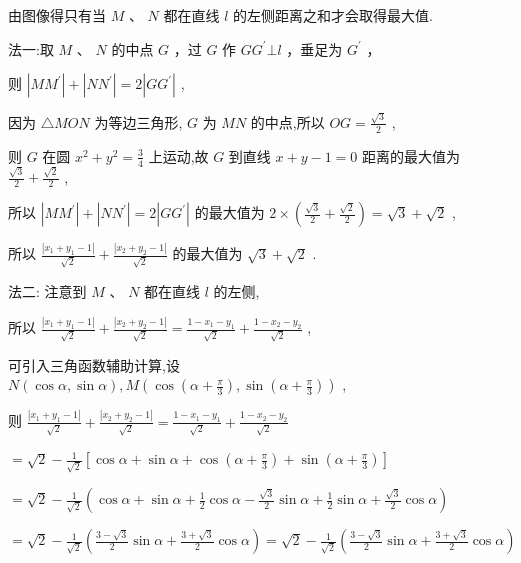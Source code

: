 \documentclass[10pt]{article}
\begin{document}
由图像得只有当 \(M\text{ 、 }N\) 都在直线 \(l\) 的左侧距离之和才会取得最大值.

法一:取 \(M\text{ 、 }N\) 的中点 \(G\) ，过 \(G\) 作 \(G{G}^{\prime } \bot  l\) ，垂足为 \({G}^{\prime }\) ，

则 \(\left| {M{M}^{\prime }}\right|  + \left| {N{N}^{\prime }}\right|  = 2\left| {G{G}^{\prime }}\right|\) ,

因为 \(\bigtriangleup {MON}\) 为等边三角形, \(G\) 为 \({MN}\) 的中点,所以 \({OG} = \frac{\sqrt{3}}{2}\) ,

则 \(G\) 在圆 \({x}^{2} + {y}^{2} = \frac{3}{4}\) 上运动,故 \(G\) 到直线 \(x + y - 1 = 0\) 距离的最大值为 \(\frac{\sqrt{3}}{2} + \frac{\sqrt{2}}{2}\) ,

所以 \(\left| {M{M}^{\prime }}\right|  + \left| {N{N}^{\prime }}\right|  = 2\left| {G{G}^{\prime }}\right|\) 的最大值为 \(2 \times  \left( {\frac{\sqrt{3}}{2} + \frac{\sqrt{2}}{2}}\right)  = \sqrt{3} + \sqrt{2}\) ,

所以 \(\frac{\left| {x}_{1} + {y}_{1} - 1\right| }{\sqrt{2}} + \frac{\left| {x}_{2} + {y}_{2} - 1\right| }{\sqrt{2}}\) 的最大值为 \(\sqrt{3} + \sqrt{2}\) .

法二: 注意到 \(M\text{ 、 }N\) 都在直线 \(l\) 的左侧,

所以 \(\frac{\left| {x}_{1} + {y}_{1} - 1\right| }{\sqrt{2}} + \frac{\left| {x}_{2} + {y}_{2} - 1\right| }{\sqrt{2}} = \frac{1 - {x}_{1} - {y}_{1}}{\sqrt{2}} + \frac{1 - {x}_{2} - {y}_{2}}{\sqrt{2}}\) ,

可引入三角函数辅助计算,设 \(N\left( {\cos \alpha ,\sin \alpha }\right) ,M\left( {\cos \left( {\alpha  + \frac{\pi }{3}}\right) ,\sin \left( {\alpha  + \frac{\pi }{3}}\right) }\right)\) ,

则 \(\frac{\left| {x}_{1} + {y}_{1} - 1\right| }{\sqrt{2}} + \frac{\left| {x}_{2} + {y}_{2} - 1\right| }{\sqrt{2}} = \frac{1 - {x}_{1} - {y}_{1}}{\sqrt{2}} + \frac{1 - {x}_{2} - {y}_{2}}{\sqrt{2}}\)

\(= \sqrt{2} - \frac{1}{\sqrt{2}}\left\lbrack  {\cos \alpha  + \sin \alpha  + \cos \left( {\alpha  + \frac{\pi }{3}}\right)  + \sin \left( {\alpha  + \frac{\pi }{3}}\right) }\right\rbrack\)

\(= \sqrt{2} - \frac{1}{\sqrt{2}}\left( {\cos \alpha  + \sin \alpha  + \frac{1}{2}\cos \alpha  - \frac{\sqrt{3}}{2}\sin \alpha  + \frac{1}{2}\sin \alpha  + \frac{\sqrt{3}}{2}\cos \alpha }\right)\)

\(= \sqrt{2} - \frac{1}{\sqrt{2}}\left( {\frac{3 - \sqrt{3}}{2}\sin \alpha  + \frac{3 + \sqrt{3}}{2}\cos \alpha }\right)  = \sqrt{2} - \frac{1}{\sqrt{2}}\left( {\frac{3 - \sqrt{3}}{2}\sin \alpha  + \frac{3 + \sqrt{3}}{2}\cos \alpha }\right)\)
\end{document}

